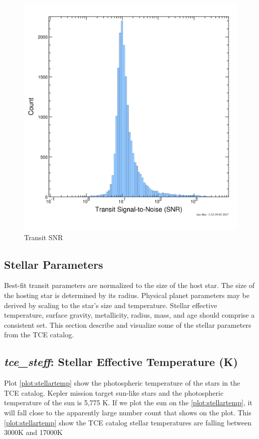 \begin{figure}[!h]
\begin{center}
        \includegraphics[width=0.5\textheight]{img/transitsnr.png}
        \caption{Transit SNR}  \label{plot:transitsnr}
\end{center}
\end{figure}

\subsection{Stellar Parameters}
Best-fit transit parameters are normalized to the size of the host star. The size of the hosting star is determined by its radius. Physical planet parameters may be derived by scaling to the star's size and temperature. Stellar effective temperature, surface gravity, metallicity, radius, mass, and age should comprise a consistent set. This section describe and visualize some of the stellar parameters from the TCE catalog.

\subsection{\emph{tce\_steff}: Stellar Effective Temperature (K)}
Plot \ref{plot:stellartemp} show the photospheric temperature of the stars in the TCE catalog. Kepler mission target sun-like stars and the photospheric temperature of the sun is 5,775 K. If we plot the sun on the \ref{plot:stellartemp}, it will fall close to the apparently large number count that shows on the plot. This \ref{plot:stellartemp} show the TCE catalog stellar temperatures are falling between 3000K and 17000K 


